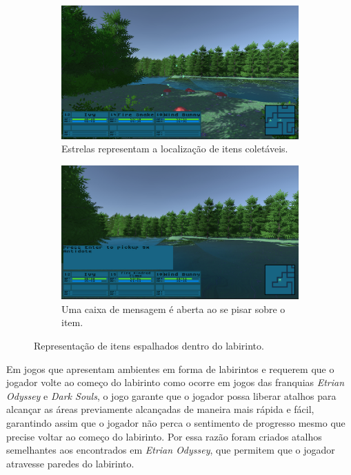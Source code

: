 \documentclass[
	12pt,				%
	openright,			%
	twoside,			%
	a4paper,			%
	english,			%
	french,				%
	spanish,			%
	brazil				%
	]{abntex2}
\begin{document}
\begin{figure}[h!]
  \centering
  \begin{subfigure}[b]{0.4\linewidth}
    \includegraphics[width=\linewidth]{itemspot.jpg}
    \caption{Estrelas representam a localização de itens coletáveis.}
  \end{subfigure}
  \begin{subfigure}[b]{0.4\linewidth}
    \includegraphics[width=\linewidth]{itemprompt.jpg}
    \caption{Uma caixa de mensagem é aberta ao se pisar sobre o item.}
  \end{subfigure}
  \caption{Representação de itens espalhados dentro do labirinto.}
  \label{fig:item1}
\end{figure}

Em jogos que apresentam ambientes em forma de labirintos e requerem que o jogador volte ao começo do labirinto como ocorre em jogos das franquias \emph{Etrian Odyssey} e \emph{Dark Souls}, o jogo garante que o jogador possa liberar atalhos para alcançar as áreas previamente alcançadas de maneira mais rápida e fácil, garantindo assim que o jogador não perca o sentimento de progresso mesmo que precise voltar ao começo do labirinto. Por essa razão foram criados atalhos semelhantes aos encontrados em \emph{Etrian Odyssey}, que permitem que o jogador atravesse paredes do labirinto.
\end{document}
